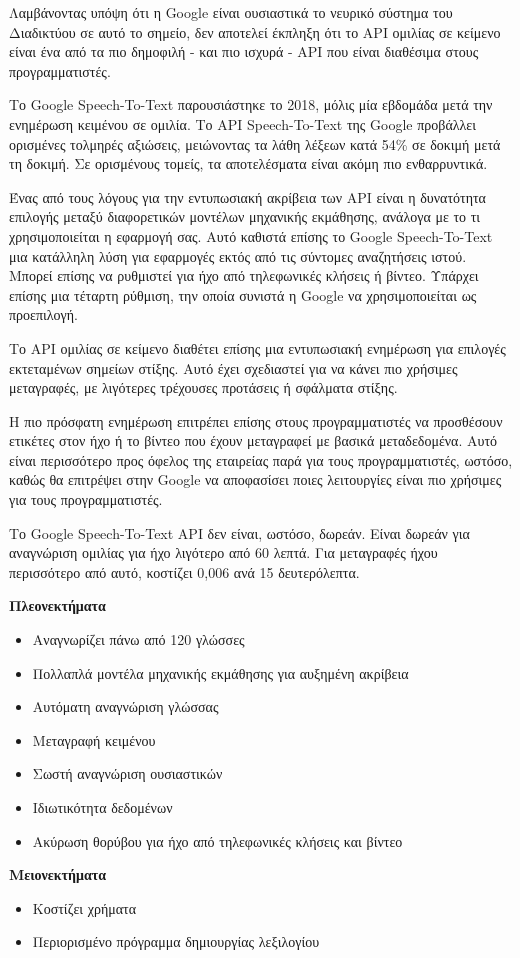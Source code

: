 \documentclass[oneside, 12pt]{book}
\begin{document}
Λαμβάνοντας υπόψη ότι η Google είναι ουσιαστικά το νευρικό σύστημα του Διαδικτύου σε αυτό το σημείο, δεν αποτελεί έκπληξη ότι το API ομιλίας σε κείμενο είναι ένα από τα πιο δημοφιλή - και πιο ισχυρά - API που είναι διαθέσιμα στους προγραμματιστές.

Το Google Speech-To-Text παρουσιάστηκε το 2018, μόλις μία εβδομάδα μετά την ενημέρωση κειμένου σε ομιλία. Το API Speech-To-Text της Google προβάλλει ορισμένες τολμηρές αξιώσεις, μειώνοντας τα λάθη λέξεων κατά 54\% σε δοκιμή μετά τη δοκιμή. Σε ορισμένους τομείς, τα αποτελέσματα είναι ακόμη πιο ενθαρρυντικά.

Ένας από τους λόγους για την εντυπωσιακή ακρίβεια των API είναι η δυνατότητα επιλογής μεταξύ διαφορετικών μοντέλων μηχανικής εκμάθησης, ανάλογα με το τι χρησιμοποιείται η εφαρμογή σας. Αυτό καθιστά επίσης το Google Speech-To-Text μια κατάλληλη λύση για εφαρμογές εκτός από τις σύντομες αναζητήσεις ιστού. Μπορεί επίσης να ρυθμιστεί για ήχο από τηλεφωνικές κλήσεις ή βίντεο. Υπάρχει επίσης μια τέταρτη ρύθμιση, την οποία συνιστά η Google να χρησιμοποιείται ως προεπιλογή.

Το API ομιλίας σε κείμενο διαθέτει επίσης μια εντυπωσιακή ενημέρωση για επιλογές εκτεταμένων σημείων στίξης. Αυτό έχει σχεδιαστεί για να κάνει πιο χρήσιμες μεταγραφές, με λιγότερες τρέχουσες προτάσεις ή σφάλματα στίξης.

Η πιο πρόσφατη ενημέρωση επιτρέπει επίσης στους προγραμματιστές να προσθέσουν ετικέτες στον ήχο ή το βίντεο που έχουν μεταγραφεί με βασικά μεταδεδομένα. Αυτό είναι περισσότερο προς όφελος της εταιρείας παρά για τους προγραμματιστές, ωστόσο, καθώς θα επιτρέψει στην Google να αποφασίσει ποιες λειτουργίες είναι πιο χρήσιμες για τους προγραμματιστές.

Το Google Speech-To-Text API δεν είναι, ωστόσο, δωρεάν. Είναι δωρεάν για αναγνώριση ομιλίας για ήχο λιγότερο από 60 λεπτά. Για μεταγραφές ήχου περισσότερο από αυτό, κοστίζει 0,006  ανά 15 δευτερόλεπτα.

\textbf{Πλεονεκτήματα}
\begin{itemize}
  \item Αναγνωρίζει πάνω από 120 γλώσσες
  \item Πολλαπλά μοντέλα μηχανικής εκμάθησης για αυξημένη ακρίβεια
  \item Αυτόματη αναγνώριση γλώσσας
  \item Μεταγραφή κειμένου
  \item Σωστή αναγνώριση ουσιαστικών
  \item Ιδιωτικότητα δεδομένων
  \item Ακύρωση θορύβου για ήχο από τηλεφωνικές κλήσεις και βίντεο
\end{itemize}
\textbf{Μειονεκτήματα}
\begin{itemize}
  \item Κοστίζει χρήματα
  \item Περιορισμένο πρόγραμμα δημιουργίας λεξιλογίου
\end{itemize}
\end{document}
